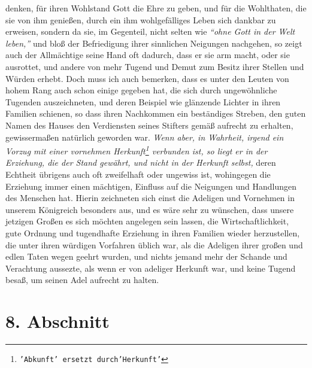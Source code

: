 denken, für ihren Wohlstand Gott die Ehre zu geben, und für die Wohlthaten, die
sie von ihm genießen, durch ein ihm wohlgefälliges Leben sich dankbar zu
erweisen, sondern da sie, im Gegenteil, nicht selten wie
\textit{"`ohne Gott in der
Welt leben,"'}  und bloß der Befriedigung ihrer sinnlichen Neigungen nachgehen,
so zeigt auch der Allmächtige seine Hand oft dadurch, dass
er sie arm macht, oder
sie ausrottet, und andere von mehr Tugend und Demut zum
Besitz ihrer Stellen
und Würden erhebt. Doch muss ich auch bemerken, dass es unter den Leuten von hohem
Rang auch schon einige gegeben hat, die sich durch ungewöhnliche Tugenden
auszeichneten, und deren Beispiel wie glänzende Lichter in ihren Familien
schienen, so dass ihren Nachkommen ein beständiges Streben, den guten Namen des
Hauses den Verdiensten seines Stifters gemäß aufrecht zu erhalten, gewissermaßen
natürlich geworden war. \textit{Wenn aber, in Wahrheit, irgend ein Vorzug mit
einer
vornehmen Herkunft\footnote{\texttt{'Abkunft' ersetzt durch'Herkunft'}} verbunden ist, so liegt er in der Erziehung,
die der Stand
gewährt, und nicht in der Herkunft selbst,} deren Echtheit übrigens auch oft
zweifelhaft oder ungewiss ist, wohingegen die Erziehung immer einen mächtigen,
Einfluss auf die Neigungen und Handlungen des Menschen hat. Hierin zeichneten
sich einst die Adeligen und Vornehmen in unserem Königreich besonders aus,
und es wäre sehr zu wünschen, dass unsere jetzigen Großen es sich möchten
angelegen sein lassen, die Wirtschaftlichkeit, gute Ordnung und tugendhafte
Erziehung in ihren Familien wieder herzustellen, die unter ihren würdigen
Vorfahren üblich war, als die Adeligen ihrer großen und edlen Taten wegen
geehrt wurden, und nichts jemand mehr der Schande und Verachtung aussezte, als
wenn er von adeliger Herkunft war, und keine Tugend besaß, um seinen Adel
aufrecht zu halten.

\section{8. Abschnitt} \label{kap11_ab8}

